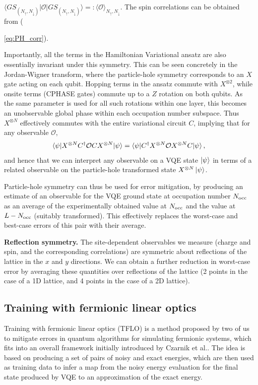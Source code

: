 \documentclass[aps,prb,twoside,superscriptaddress,longbibliography,nofootinbib,floatfix, notitlepage,twocolumn]{revtex4-1}
\newcommand{\Nocc}{N_{\rm{occ}}}
\newcommand{\be}{\begin{equation}}
\newcommand{\ee}{\end{equation}}
\begin{document}
$\langle GS_{(N_{\uparrow},N_{\downarrow})}|\mathcal{O}|GS_{(N_{\uparrow},N_{\downarrow})}\rangle =: \langle\mathcal{O}\rangle_{N_{\uparrow},N_{\downarrow}}$. The spin correlations can be obtained from ({\ref{eq:PH_corr}).

Importantly, all the terms in the Hamiltonian Variational ansatz are also essentially invariant under this symmetry. This can be seen concretely in the Jordan-Wigner transform, where the particle-hole symmetry corresponds to an $X$ gate acting on each qubit. Hopping terms in the ansatz commute with $X^{\otimes 2}$, while onsite terms (CPHASE gates) commute up to a $Z$ rotation on both qubits. As the same parameter is used for all such rotations within one layer, this becomes an unobservable global phase within each occupation number subspace. Thus $X^{\otimes N}$ effectively commutes with the entire variational circuit $C$, implying that for any observable $\mathcal{O}$,
%
\be \braket{\psi|X^{\otimes N} C^\dag \mathcal{O} C X^{\otimes N}|\psi} = \braket{\psi|C^\dag X^{\otimes N} \mathcal{O} X^{\otimes N} C|\psi}, \ee
%
and hence that we can interpret any observable on a VQE state $\ket{\psi}$ in terms of a related observable on the particle-hole transformed state $X^{\otimes N}\ket{\psi}$.

Particle-hole symmetry can thus be used for error mitigation, by producing an estimate of an observable for the VQE ground state at occupation number $\Nocc$ as an average of the experimentally obtained value at $\Nocc$ and the value at $L-\Nocc$ (suitably transformed). This effectively replaces the worst-case and best-case errors of this pair with their average.

\textbf{Reflection symmetry.} The site-dependent observables we measure (charge and spin, and the corresponding correlations) are symmetric about reflections of the lattice in the $x$ and $y$ directions. We can obtain a further reduction in worst-case error by averaging these quantities over reflections of the lattice (2 points in the case of a 1D lattice, and 4 points in the case of a 2D lattice).


\subsection{Training with fermionic linear optics}
\label{app:tflo}

Training with fermionic linear optics (TFLO) is a method proposed by two of us\cite{montanaro21} to mitigate errors in quantum algorithms for simulating fermionic systems, which fits into an overall framework initially introduced by Czarnik et al.\cite{czarnik20}. The idea is based on producing a set of pairs of noisy and exact energies, which are then used as training data to infer a map from the noisy energy evaluation for the final state produced by VQE to an approximation of the exact energy.

}
\end{document}
